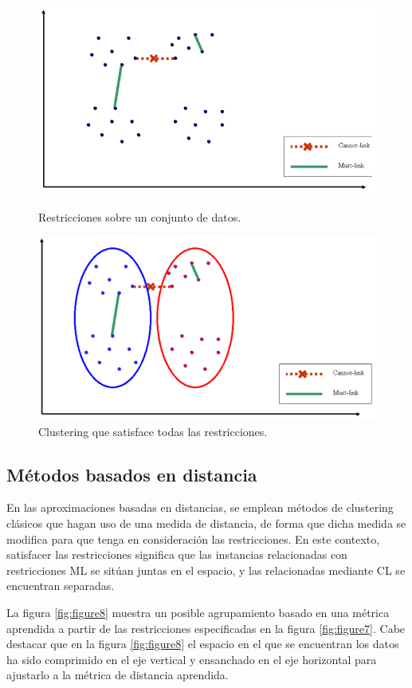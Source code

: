 \begin{figure}[bth]
	\myfloatalign
	{\includegraphics[width=.6\linewidth]{imagenes/c3/InputInstancesAndConst1}
	\caption{Restricciones sobre un conjunto de datos. \cite{Survey:2007}} \label{fig:figure5}
	}
	{\includegraphics[width=.6\linewidth]{imagenes/c3/ClusteringSatAll}
	\caption{Clustering que satisface todas las restricciones. \cite{Survey:2007}} \label{fig:figure6}
	}
\end{figure}

\subsection{Métodos basados en distancia}

En las aproximaciones basadas en distancias, se emplean métodos de clustering clásicos que hagan uso de una medida de distancia, de forma que dicha medida se modifica para que tenga en consideración las restricciones. En este contexto, satisfacer las restricciones significa que las instancias relacionadas con restricciones \acf{ML} se sitúan juntas en el espacio, y las relacionadas mediante \acf{CL} se encuentran separadas.

La figura \ref{fig:figure8} muestra un posible agrupamiento basado en una métrica aprendida a partir de las restricciones especificadas en la figura \ref{fig:figure7}. Cabe destacar que en la figura \ref{fig:figure8} el espacio en el que se encuentran los datos ha sido comprimido en el eje vertical y ensanchado en el eje horizontal para ajustarlo a la métrica de distancia aprendida.

